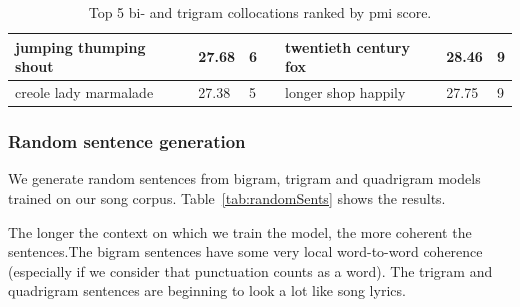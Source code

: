 \documentclass[a4paper,12pt]{article}
\begin{document}
\begin{table}[]
\begin{tabular}{|l|l|l|l|l|l|l|}
\rowcolor[HTML]{EFEFEF} 
jumping thumping shout         & 27.68                   & 6                      &                         & twentieth century fox       & 28.46                    & 9                        \\ \hline
\rowcolor[HTML]{EFEFEF} 
creole lady marmalade          & 27.38                   & 5                      &                         & longer shop happily         & 27.75                    & 9                        \\ \hline
\end{tabular}
\caption{Top 5 bi- and trigram collocations ranked by pmi score.}
\end{table}



\subsubsection{Random sentence generation}
We generate random sentences from bigram, trigram and quadrigram models trained on our song corpus. Table~\ref{tab:randomSents} shows the results.

\begin{table}[]
\centering
{}
\caption{Sentences generated from N-gram models randomly}
\label{tab:randomSents}
\end{table}
The longer the context on which we train the model, the more coherent the sentences.The bigram sentences have some very local word-to-word
coherence (especially if we consider that punctuation counts as a word). The trigram and quadrigram sentences are beginning to look a lot like song lyrics.
\end{document}
